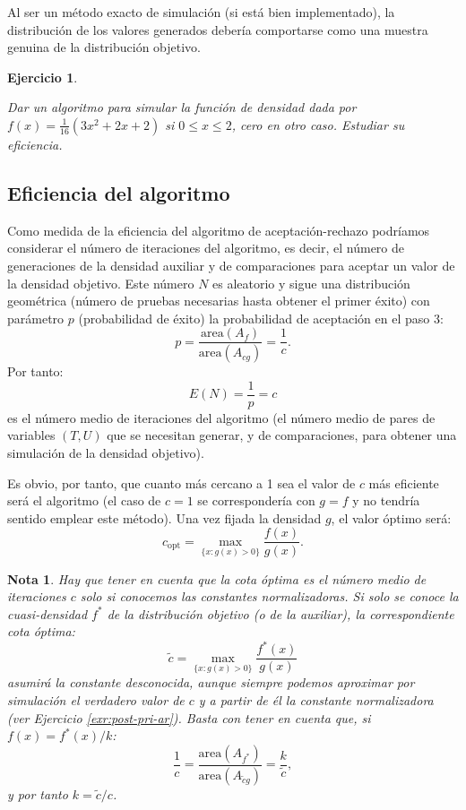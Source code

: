\documentclass[
]{book}
\theoremstyle{break}
\newtheorem{exercise}{Ejercicio}[chapter]
\theoremstyle{nonumberplain}
\newtheorem{remark}{Nota}
\begin{document}
Al ser un método exacto de simulación (si está bien implementado), la distribución de los valores generados debería comportarse como una muestra genuina de la distribución objetivo.

\begin{exercise}
\protect\hypertarget{exr:dacotada-ar}{}\label{exr:dacotada-ar}

Dar un algoritmo para simular la función de densidad dada por
\(f\left(x\right) = \frac{1}{16} \left( 3x^{2}+2x+2 \right)\) si
\(0 \le x \le 2\), cero en otro caso. Estudiar su eficiencia.
\end{exercise}

\hypertarget{eficiencia-del-algoritmo}{%
\subsection{Eficiencia del algoritmo}\label{eficiencia-del-algoritmo}}

Como medida de la eficiencia del algoritmo de aceptación-rechazo podríamos considerar el número de iteraciones del algoritmo, es decir, el número de generaciones de la densidad auxiliar y de comparaciones para aceptar un valor de la densidad objetivo.
Este número \(N\) es aleatorio y sigue una distribución geométrica (número de pruebas necesarias hasta obtener el primer éxito) con parámetro \(p\) (probabilidad de éxito) la probabilidad de aceptación en el paso 3:
\[p = \frac{\text{area}\left(A_{f}\right)}{\text{area}\left( A_{cg}\right)} = \frac{1}{c}.\]
Por tanto:
\[E\left( N \right) = \frac1p = c\]
es el número medio de iteraciones del algoritmo (el número medio de pares de variables \(\left( T,U\right)\) que se necesitan generar, y de comparaciones, para obtener una simulación de la densidad objetivo).

Es obvio, por tanto, que cuanto más cercano a 1 sea el valor de \(c\) más eficiente será el algoritmo (el caso de \(c=1\) se correspondería con \(g=f\) y no tendría sentido emplear este método).
Una vez fijada la densidad \(g\), el valor óptimo será:
\[c_{\text{opt}}=\max_{\{x : g(x) > 0\}} \frac{f(x)}{g(x)}.\]

\begin{remark}
Hay que tener en cuenta que la cota óptima es el número medio de iteraciones \(c\) solo si conocemos las constantes normalizadoras.
Si solo se conoce la cuasi-densidad \(f^{\ast}\) de la distribución objetivo (o de la auxiliar), la correspondiente cota óptima:
\[\tilde{c} = \max_{\{x : g(x) > 0\}} \frac{f^{\ast}(x)}{g(x)}\]
asumirá la constante desconocida, aunque siempre podemos aproximar por simulación el verdadero valor de \(c\) y a partir de él la constante normalizadora (ver Ejercicio \ref{exr:post-pri-ar}).
Basta con tener en cuenta que, si \(f(x) = f^{\ast}(x)/k\):
\[\frac{1}{c} = \frac{\text{area}\left(A_{f^{\ast}}\right)}{\text{area}\left( A_{\tilde{c}g}\right)} = \frac{k}{\tilde{c}},\]
y por tanto \(k= \tilde{c}/c\).
\end{remark}
\end{document}
